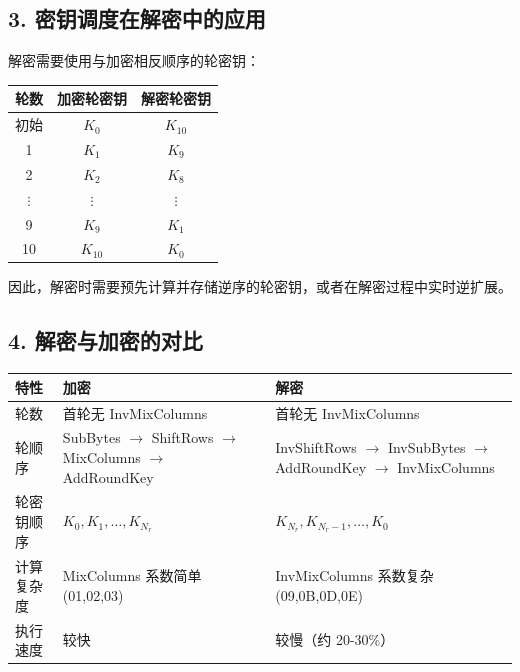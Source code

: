 \documentclass[12pt, a4paper]{article}
\begin{document}
\subsection{3. 密钥调度在解密中的应用}

解密需要使用与加密相反顺序的轮密钥：

\begin{tcolorbox}[notebox=轮密钥顺序]
\begin{center}
\begin{tabular}{c|c|c}
\hline
轮数 & 加密轮密钥 & 解密轮密钥 \\
\hline
初始 & $K_0$ & $K_{10}$ \\
1 & $K_1$ & $K_9$ \\
2 & $K_2$ & $K_8$ \\
$\vdots$ & $\vdots$ & $\vdots$ \\
9 & $K_9$ & $K_1$ \\
10 & $K_{10}$ & $K_0$ \\
\hline
\end{tabular}
\end{center}
\end{tcolorbox}

因此，解密时需要预先计算并存储逆序的轮密钥，或者在解密过程中实时逆扩展。

\subsection{4. 解密与加密的对比}

\begin{tcolorbox}[notebox=关键差异]
\begin{center}
\begin{tabular}{p{4cm}|p{5cm}|p{5cm}}
\hline
特性 & 加密 & 解密 \\
\hline
轮数 & 首轮无 InvMixColumns & 首轮无 InvMixColumns \\
轮顺序 & SubBytes $\rightarrow$ ShiftRows $\rightarrow$ MixColumns $\rightarrow$ AddRoundKey & InvShiftRows $\rightarrow$ InvSubBytes $\rightarrow$ AddRoundKey $\rightarrow$ InvMixColumns \\
轮密钥顺序 & $K_0, K_1, \dots, K_{N_r}$ & $K_{N_r}, K_{N_r-1}, \dots, K_0$ \\
计算复杂度 & MixColumns 系数简单 (01,02,03) & InvMixColumns 系数复杂 (09,0B,0D,0E) \\
执行速度 & 较快 & 较慢（约 20-30\%） \\
\hline
\end{tabular}
\end{center}
\end{tcolorbox}
\end{document}
